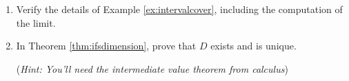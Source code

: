 \begin{exercises}
\begin{enumerate}
	
		\item Verify the details of Example \ref{ex:intervalcover}, including the computation of the limit.
	
		\item In Theorem \ref{thm:ifsdimension}, prove that $D$ exists and is unique.\par
		(\emph{Hint: You'll need the intermediate value theorem from calculus})
		
	\end{enumerate}
\end{exercises}